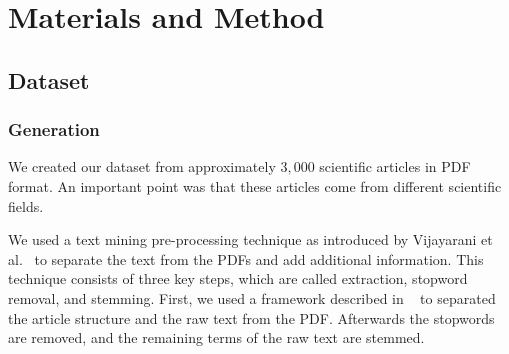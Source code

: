\chapter{Materials and Method}
\label{cha:materials_and_method}

\section{Dataset}
\label{sec:dataset}

\subsection{Generation}
\label{subsec:generation}

We created our dataset from approximately $3,000$ scientific articles in PDF format. An important point was that these articles come from different scientific fields.

We used a text mining pre-processing technique as introduced by Vijayarani et al.~\cite{Vijayarani2015} to separate the text from the PDFs and add additional information. This technique consists of three key steps, which are called extraction, stopword removal, and stemming. First, we used a framework described in ~\cite{KlampflGJK14} to separated the article structure and the raw text from the PDF. Afterwards the stopwords are removed, and the remaining terms of the raw text are stemmed.

